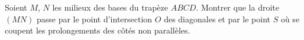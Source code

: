 Soient $M$, $N$ les milieux des bases du trapèze $ABCD$. Montrer que la droite $(MN)$ passe par le point d'intersection $O$ des diagonales et par le point $S$ où se coupent les prolongements des côtés non parallèles.
